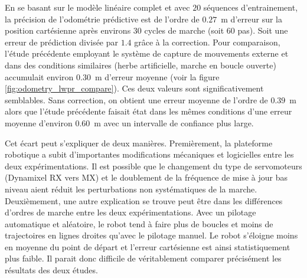 En se basant sur le modèle linéaire complet et avec $20$ séquences d'entrainement, 
la précision de l'odométrie prédictive est de l'ordre de $0.27$~m d'erreur sur la position 
cartésienne après environs $30$ cycles de marche (soit $60$ pas).
Soit une erreur de prédiction divisée par $1.4$ grâce à la correction.
Pour comparaison, l'étude précédente employant le système de capture 
de mouvements externe et dans des conditions similaires 
(herbe artificielle, marche en boucle ouverte) accumulait environ $0.30$~m d'erreur moyenne
(voir la figure \ref{fig:odometry_lwpr_compare}).
Ces deux valeurs sont significativement semblables.
Sans correction, on obtient une erreur moyenne de l'ordre de $0.39$~m alors
que l'étude précédente faisait état dans les mêmes conditions d'une erreur moyenne
d'environ $0.60$~m avec un intervalle de confiance plus large.

Cet écart peut s'expliquer de deux manières.
Premièrement, la plateforme robotique a subit d'importantes modifications 
mécaniques et logicielles entre les deux expérimentations.
Il est possible que le changement du type de servomoteurs (Dynamixel RX vers MX)
et le doublement de la fréquence de mise à jour bas niveau aient
réduit les perturbations non systématiques de la marche.
Deuxièmement, une autre explication se trouve peut être dans les
différences d'ordres de marche entre les deux expérimentations.
Avec un pilotage automatique et aléatoire, le robot tend à faire 
plus de boucles et moins de trajectoires en lignes droites qu'avec
le pilotage manuel.
Le robot s'éloigne moins en moyenne du point de départ et
l'erreur cartésienne est ainsi statistiquement plus faible.
Il parait donc difficile de véritablement comparer précisément 
les résultats des deux études.\\

